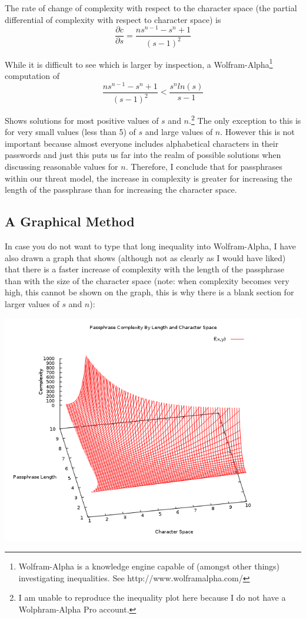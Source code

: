 \documentclass[11pt,a4paper]{article}
\begin{document}
The rate of change of complexity with respect to the character space (the partial differential of complexity with respect to character space) is \[ \frac{\partial c}{\partial s} = \frac{ns^{n-1}-s^n+1}{(s-1)^2}\]

While it is difficult to see which is larger by inspection, a Wolfram-Alpha\footnote{Wolfram-Alpha is a knowledge engine capable of (amongst other things) investigating inequalities. See http://www.wolframalpha.com/} computation of \[\frac{ns^{n-1}-s^n+1}{(s-1)^2} < \frac{s^n ln(s)}{s-1}\]

Shows solutions for most positive values of $s$ and $n$.\footnote{I am unable to reproduce the inequality plot here because I do not have a Wolphram-Alpha Pro account.} The only exception to this is for very small values (less than 5) of $s$ and large values of $n$. However this is not important because almost everyone includes alphabetical characters in their passwords and just this puts us far into the realm of possible solutions when discussing reasonable values for $n$. Therefore, I conclude that for passphrases within our threat model, the increase in complexity is greater for increasing the length of the passphrase than for increasing the character space.

\subsection{A Graphical Method}
In case you do not want to type that long inequality into Wolfram-Alpha, I have also drawn a graph that shows (although not as clearly as I would have liked) that there is a faster increase of complexity with the length of the passphrase than with the size of the character space (note: when complexity becomes very high, this cannot be shown on the graph, this is why there is a blank section for larger values of $s$ and $n$):

\includegraphics[scale=0.6]{graph1.png}
\pagebreak
\end{document}
